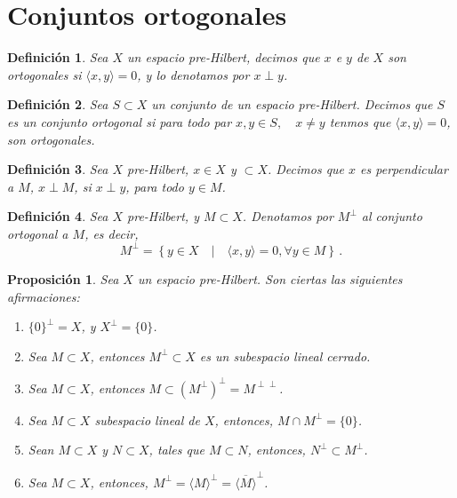\documentclass[12pt]{book}
\newtheorem{defn}{\bf Definición}[chapter]
\newtheorem{prop}{\bf Proposición}[chapter]
\newcommand{\lin}[1]{\langle #1 \rangle}
\begin{document}
\section{Conjuntos ortogonales}
\begin{defn} Sea $X$ un  espacio pre-Hilbert, decimos que $x$ e $y$ de $X$ son ortogonales si $\lin{x,y}=0$, y lo denotamos  por $x\perp y$.
\end{defn}
\begin{defn} Sea $S\subset X$ un conjunto de un espacio pre-Hilbert. Decimos que $S$ es un  conjunto ortogonal  si para todo par $x,y\in S,\quad x\not=y$ tenmos que $\lin{x,y}=0$, son ortogonales.
\end{defn}
\begin{defn} Sea $X$ pre-Hilbert,  $x\in X$ y $\subset X$. Decimos que $x$ es perpendicular a $M$, $x\perp M$,  si $x\perp y$,  para todo $y\in M$.
\end{defn}
\begin{defn} Sea $X$ pre-Hilbert, y $M\subset X$. Denotamos por $M^\perp$ al conjunto ortogonal a $M$, es decir,
$$M^\perp =\left\{y\in X\quad|\quad \lin{x,y}=0, \forall y\in M\right\}\,.$$
\end{defn}
\begin{prop} Sea $X$ un espacio pre-Hilbert. Son ciertas las siguientes afirmaciones:
\begin{enumerate}
\item $\{0\}^\perp=X$, y $X^\perp=\{0\}$.
\item Sea $M\subset X$, entonces $M^\perp\subset X$ es un subespacio lineal cerrado.
\item Sea $M\subset X$, entonces  $M\subset (M^\perp)^\perp=M^{\perp\perp}$.
\item Sea $M\subset X$ subespacio lineal de $X$, entonces, $M\cap M^\perp=\{0\}$.
\item Sean $M\subset X$ y $N\subset X$, tales que $M\subset N$, entonces, $N^\perp\subset M^\perp$.
\item Sea $M\subset X$, entonces, $M^\perp=\lin{M}^\perp=\overline{\lin{M}}^\perp$.
\end{enumerate}
\end{prop}
\end{document}
